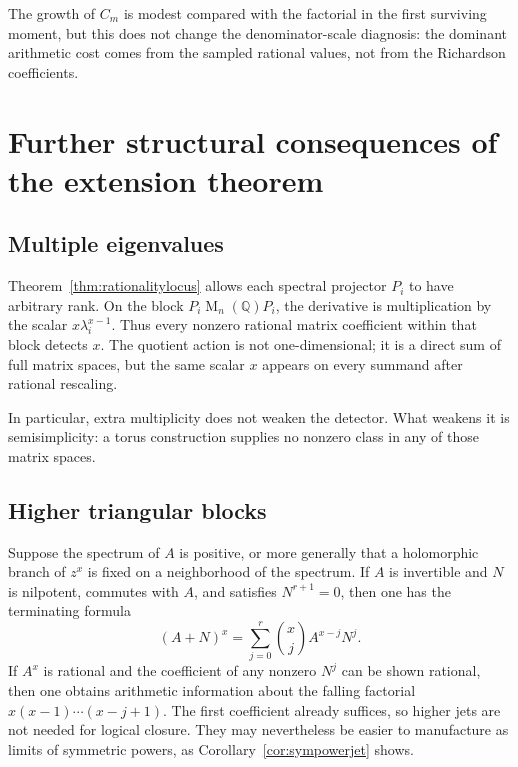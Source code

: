 \documentclass[11pt,oneside]{article}
\theoremstyle{definition}
\theoremstyle{remark}
\newcommand{\Q}{\mathbb Q}
\newcommand{\Mat}{\operatorname{M}}
\begin{document}
The growth of $C_m$ is modest compared with the factorial in the first surviving moment, but
this does not change the denominator-scale diagnosis: the dominant arithmetic cost comes from
the sampled rational values, not from the Richardson coefficients.

\section{Further structural consequences of the extension theorem}
\label{app:extensions}

\subsection{Multiple eigenvalues}

Theorem~\ref{thm:rationalitylocus} allows each spectral projector $P_i$ to have arbitrary rank.
On the block $P_i\Mat_n(\Q)P_i$, the derivative is multiplication by the scalar
$x\lambda_i^{x-1}$.  Thus every nonzero rational matrix coefficient within that block detects
$x$.  The quotient action is not one-dimensional; it is a direct sum of full matrix spaces,
but the same scalar $x$ appears on every summand after rational rescaling.

In particular, extra multiplicity does not weaken the detector.  What weakens it is
semisimplicity: a torus construction supplies no nonzero class in any of those matrix spaces.

\subsection{Higher triangular blocks}

Suppose the spectrum of $A$ is positive, or more generally that a holomorphic branch of
$z^x$ is fixed on a neighborhood of the spectrum.  If $A$ is invertible and $N$ is nilpotent,
commutes with $A$, and satisfies $N^{r+1}=0$, then one has the terminating
formula
\begin{equation}
 (A+N)^x
 =\sum_{j=0}^r\binom{x}{j}A^{x-j}N^j.
 \label{eq:higherjet}
\end{equation}
If $A^x$ is rational and the coefficient of any nonzero $N^j$ can be shown rational, then one
obtains arithmetic information about the falling factorial
$x(x-1)\cdots(x-j+1)$.  The first coefficient already suffices, so higher jets are not needed
for logical closure.  They may nevertheless be easier to manufacture as limits of symmetric
powers, as Corollary~\ref{cor:sympowerjet} shows.
\end{document}
